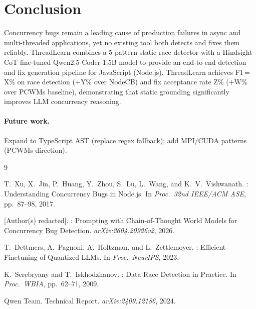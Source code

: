\documentclass[11pt]{article}
\begin{document}
\section{Conclusion}
\label{sec:conclusion}

Concurrency bugs remain a leading cause of production failures in async and
multi-threaded applications, yet no existing tool both detects and fixes them
reliably.
ThreadLearn combines a 5-pattern static race detector with a Hindsight CoT
fine-tuned Qwen2.5-Coder-1.5B model to provide an end-to-end detection and
fix generation pipeline for JavaScript (Node.js).
ThreadLearn achieves F1\,=\,X\% on race detection ($+$Y\% over NodeCB) and fix
acceptance rate Z\% ($+$W\% over PCWMs baseline), demonstrating that static
grounding significantly improves LLM concurrency reasoning.

\paragraph{Future work.}
Expand to TypeScript AST (replace regex fallback);
add MPI/CUDA patterns (PCWMs direction).

\begin{thebibliography}{9}

  T.\ Xu, X.\ Jin, P.\ Huang, Y.\ Zhou, S.\ Lu, L.\ Wang, and
  K.\ V.\ Vishwanath.
  : Understanding Concurrency Bugs in Node.js.
  \newblock In \emph{Proc.\ 32nd IEEE/ACM ASE}, pp.\ 87--98, 2017.

  [Author(s) redacted].
  : Prompting with Chain-of-Thought World Models for
  Concurrency Bug Detection.
  \newblock \emph{arXiv:2604.20926v2}, 2026.

  T.\ Dettmers, A.\ Pagnoni, A.\ Holtzman, and L.\ Zettlemoyer.
  : Efficient Finetuning of Quantized LLMs.
  \newblock In \emph{Proc.\ NeurIPS}, 2023.

  K.\ Serebryany and T.\ Iskhodzhanov.
  : Data Race Detection in Practice.
  \newblock In \emph{Proc.\ WBIA}, pp.\ 62--71, 2009.

  Qwen Team.
   Technical Report.
  \newblock \emph{arXiv:2409.12186}, 2024.

\end{thebibliography}
\end{document}

